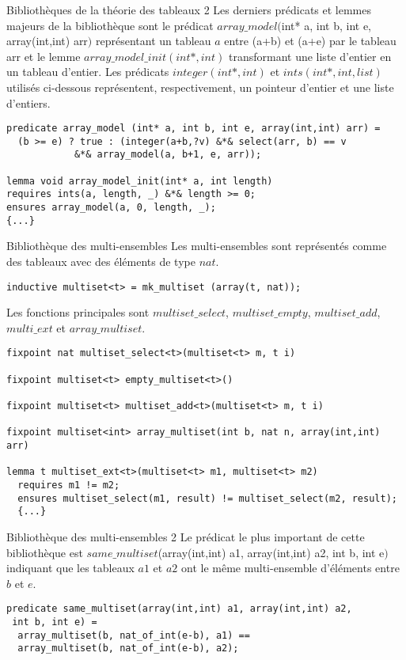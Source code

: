 \documentclass[9pt]{beamer}
\begin{document}
\begin{frame}[fragile]{Biblioth\`eques de la th\'eorie des tableaux 2}
Les derniers pr\'edicats et lemmes majeurs de la biblioth\`eque sont le pr\'edicat $array\_model($int* a, int b, int e, array(int,int) arr$)$ repr\'esentant un tableau $a$ entre (a+b) et (a+e) par le tableau arr et le lemme $array\_model\_init(int*,int)$ transformant une liste d'entier en un tableau d'entier. Les pr\'edicats $integer(int*,int)$ et $ints(int*,int,list)$ utilis\'es ci-dessous repr\'esentent, respectivement, un pointeur d'entier et une liste d'entiers.
			\begin{lstlisting}[basicstyle=\footnotesize]
predicate array_model (int* a, int b, int e, array(int,int) arr) =
  (b >= e) ? true : (integer(a+b,?v) &*& select(arr, b) == v 
  			&*& array_model(a, b+1, e, arr));
  			
lemma void array_model_init(int* a, int length)
requires ints(a, length, _) &*& length >= 0;
ensures array_model(a, 0, length, _);
{...}

			\end{lstlisting}
\end{frame}

\begin{frame}[fragile]{Biblioth\`eque des multi-ensembles}
	Les multi-ensembles sont repr\'esent\'es comme des tableaux avec des \'el\'ements de type $nat$.
			\begin{lstlisting}[basicstyle=\footnotesize]
  inductive multiset<t> = mk_multiset (array(t, nat));
			\end{lstlisting}
			Les fonctions principales sont $multiset\_select$, $multiset\_empty$, $multiset\_add$, $multi\_ext$  et $array\_multiset$.
			\begin{lstlisting}[basicstyle=\footnotesize]
fixpoint nat multiset_select<t>(multiset<t> m, t i)

fixpoint multiset<t> empty_multiset<t>()

fixpoint multiset<t> multiset_add<t>(multiset<t> m, t i)

fixpoint multiset<int> array_multiset(int b, nat n, array(int,int) arr) 

lemma t multiset_ext<t>(multiset<t> m1, multiset<t> m2)
  requires m1 != m2;
  ensures multiset_select(m1, result) != multiset_select(m2, result);
  {...}
			\end{lstlisting}
			
			
\end{frame}

\begin{frame}[fragile]{Biblioth\`eque des multi-ensembles 2}
Le pr\'edicat le plus important de cette biblioth\`eque est $same\_multiset$(array(int,int) a1, array(int,int) a2, int b, int e$)$ indiquant que les tableaux $a1$ et $a2$ ont le m\^eme multi-ensemble d'\'el\'ements entre $b$ et $e$.
	\begin{lstlisting}[basicstyle=\footnotesize]
predicate same_multiset(array(int,int) a1, array(int,int) a2,
 int b, int e) =
  array_multiset(b, nat_of_int(e-b), a1) == 
  array_multiset(b, nat_of_int(e-b), a2);
	\end{lstlisting}
\end{frame}
\end{document}
